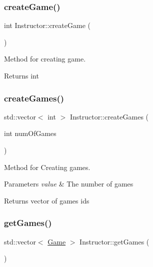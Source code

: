 \subsubsection{\texorpdfstring{create\+Game()}{createGame()}}
{\footnotesize\ttfamily int Instructor\+::create\+Game (\begin{DoxyParamCaption}{ }\end{DoxyParamCaption})}



Method for creating game. 

\begin{DoxyReturn}{Returns}
int 
\end{DoxyReturn}
\mbox{\label{classInstructor_afe6b1a0378d5324e9fb2c2d253cf964a}} 
\subsubsection{\texorpdfstring{create\+Games()}{createGames()}}
{\footnotesize\ttfamily std\+::vector$<$ int $>$ Instructor\+::create\+Games (\begin{DoxyParamCaption}\item[{int}]{num\+Of\+Games }\end{DoxyParamCaption})}



Method for Creating games. 


\begin{DoxyParams}{Parameters}
{\em value} & The number of games \\
\hline
\end{DoxyParams}
\begin{DoxyReturn}{Returns}
vector of games ids 
\end{DoxyReturn}
\mbox{\label{classInstructor_ad3d7b1236562817ef13339bebed4e2d6}} 
\subsubsection{\texorpdfstring{get\+Games()}{getGames()}}
{\footnotesize\ttfamily std\+::vector$<$ \hyperlink{classGame}{Game} $>$ Instructor\+::get\+Games (\begin{DoxyParamCaption}{ }\end{DoxyParamCaption})}



